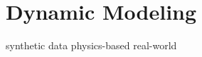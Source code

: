 \section{Dynamic Modeling} 
\label{sec:experiments:dynamic_modeling}

synthetic data
physics-based
real-world

